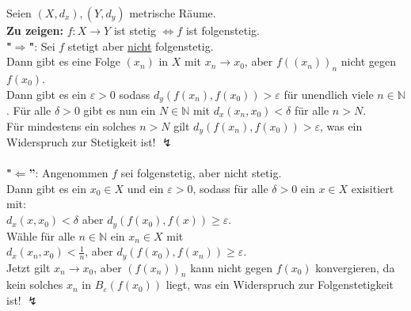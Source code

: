 \begin{problem*}[2]
Seien $(X,d_x), (Y,d_y)$ metrische Räume.\\
\textbf{Zu zeigen:} $f: X \to Y$ ist stetig $\Leftrightarrow f$ ist folgenstetig.\\
\textbf{"$\Rightarrow$"}: Sei $ f $ stetigt aber \underline{nicht} folgenstetig.\\
Dann gibt es eine Folge $ (x_n) $ in $ X $ mit $x_n \to x_0$, aber $f((x_n))_n$ nicht gegen $f(x_0)$.\\
Dann gibt es ein $ \varepsilon > 0$ sodass $ d_y(f(x_n),f(x_0)) > \varepsilon$ für unendlich viele $n \in \mathbb{N}$. Für alle $\delta > 0$ gibt es nun ein $N \in \mathbb{N}$ mit $ d_x(x_n,x_0) < \delta $ für alle $n > N$. \\
Für mindestens ein solches $n > N$ gilt $d_y(f(x_n),f(x_0)) > \varepsilon$, was ein Widerspruch zur Stetigkeit ist!  $\lightning$ \\
\\
\textbf{"$\Leftarrow$”}: Angenommen $ f $ sei folgenstetig, aber nicht stetig.\\
Dann gibt es ein $x_0 \in X$ und ein $ \varepsilon > 0 $, sodass für alle $\delta > 0$ ein $x \in X$ exisitiert mit: \\
$d_x(x,x_0) < \delta$ aber $d_y(f(x_0),f(x)) \geq \varepsilon$.\\
Wähle für alle $n \in \mathbb{N}$ ein $x_n \in X $ mit\\
$d_x(x_n,x_0) < \frac{1}{n}$, aber $d_y(f(x_0), f(x_n)) \geq \varepsilon$. \\
Jetzt gilt $x_n \to x_0$, aber $(f(x_n))_n$ kann nicht gegen $f(x_0)$ konvergieren, da kein solches $x_n$ in $B_{ \varepsilon }(f(x_0))$ liegt, was ein Widerspruch zur Folgenstetigkeit ist! $\lightning$
\end{problem*}
% 
\newpage
